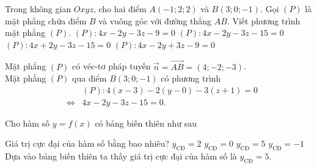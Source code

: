 \begin{ex}%
	Trong không gian $Oxyz$, cho hai điểm $A(-1;2;2)$ và $B(3;0;-1)$. Gọi $(P)$ là mặt phẳng chứa điểm $B$ và vuông góc với đường thẳng $AB$. Viết phương trình mặt phẳng $(P)$.
	\choice
	{$(P)\colon4x-2y-3z-9=0$}
	{\True $(P)\colon4x-2y-3z-15=0$}
	{$(P)\colon4x+2y-3z-15=0$}
	{$(P)\colon4x-2y+3z-9=0$}
	\loigiai
	{
		Mặt phẳng $(P)$ có véc-tơ pháp tuyến $\vec{n}=\vec{AB}=(4;-2;-3)$.\\
		Mặt phẳng $(P)$ qua điểm $B(3;0;-1)$ có phương trình 
		\begin{eqnarray*}
			& &(P)\colon4(x-3)-2(y-0)-3(z+1)=0 \\
			& \Leftrightarrow &4x-2y-3z-15=0.
		\end{eqnarray*}
	
	}
\end{ex}

\begin{ex}%
	Cho hàm số $y=f(x)$ có bảng biến thiên như sau
	\begin{center}
	\end{center}
	Giá trị cực đại của hàm số bằng bao nhiêu?
	\choice
	{$y_\text{CĐ}=2$}
	{$y_\text{CĐ}=0$}
	{\True $y_\text{CĐ}=5$}
	{$y_\text{CĐ}=-1$}
	\loigiai
	{
		Dựa vào bảng biến thiên ta thấy giá trị cực đại của hàm số là $y_\text{CĐ}=5$.
	}
\end{ex}

